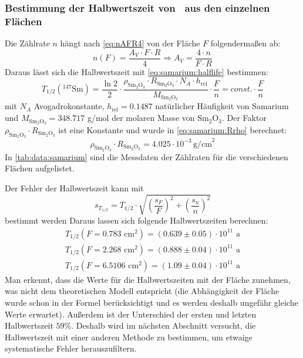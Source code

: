 \subsubsection{Bestimmung der Halbwertszeit von \samarium ~aus den einzelnen Flächen}
\label{subsub:samarium:halflife:single}
Die Zählrate $n$ hängt nach \autoref{eq:nAFR4} von der Fläche $F$ folgendermaßen ab:
\begin{equation}
\label{eq:samarium:counts_eval}
  n(F) = \frac{A_V \cdot F \cdot R}{4} \Rightarrow A_V = \frac{4 \cdot n}{F \cdot R}
\end{equation}
Daraus lässt sich die Halbwertszeit mit \autoref{eq:samarium:halflife} bestimmen:
\begin{equation}
  \label{eq:samarium:halflife_eval}
  T_{1/2}({}^{147}\text{Sm}) = \frac{\ln 2}{2} \cdot
      \frac{\rho_{\text{Sm}_2\text{O}_3} \cdot R_{\text{Sm}_2\text{O}_3} \cdot N_A \cdot h_{\text{rel}}}{M_{\text{Sm}_2\text{O}_3}} 
  	  \cdot \frac{F}{n} = const. \cdot \frac{F}{n}
\end{equation}
mit $N_A$ Avogadrokonstante, $h_{\text{rel}} = 0.1487$ natürlicher Häufigkeit von Samarium und $M_{\text{Sm}_2\text{O}_3} = 348.717$ g/mol der 
molaren Masse von $\text{Sm}_2\text{O}_3$.
Der Faktor $\rho_{\text{Sm}_2\text{O}_3} \cdot R_{\text{Sm}_2\text{O}_3}$ ist eine Konstante und wurde in \autoref{eq:samarium:Rrho} berechnet:
\begin{equation}
  \rho_{\text{Sm}_2\text{O}_3} \cdot R_{\text{Sm}_2\text{O}_3} = 4.025 \cdot 10^{-3} \, \text{g/cm}^2
\end{equation}
In \autoref{tab:data:samarium} sind die Messdaten der Zählraten für die verschiedenen Flächen aufgelistet.

Der Fehler der Halbwertszeit kann mit 
\begin{equation}
  s_{T_{1/2}} = T_{1/2} \cdot \sqrt{ \left( \frac{s_F}{F} \right)^2 + \left( \frac{s_n}{n} \right)^2 }
\end{equation}
bestimmt werden
Daraus lassen sich folgende Halbwertszeiten berechnen:
\begin{gather}
  T_{1/2}(F=0.783 \text{ cm}^2) = (0.639 \pm 0.05)\cdot 10^{11} \text{ a} \\
  T_{1/2}(F=2.268 \text{ cm}^2) = (0.888 \pm 0.04)\cdot 10^{11} \text{ a}\\
  T_{1/2}(F=6.5106 \text{ cm}^2) = (1.09 \pm 0.04)\cdot 10^{11} \text{ a}
\end{gather}
Man erkennt, dass die Werte für die Halbwertszeiten mit der Fläche zunehmen, was nicht dem theoretischen Modell entspricht (die Abhängigkeit der 
Fläche wurde schon in der Formel berücksichtigt und es werden deshalb ungefähr gleiche Werte erwartet). Außerdem ist der Unterschied der ersten und letzten 
Halbwertszeit $59\%$. Deshalb wird im nächsten Abschnitt versucht, die Halbwertszeit mit einer anderen Methode zu bestimmen, 
um etwaige systematische Fehler herauszufiltern.

